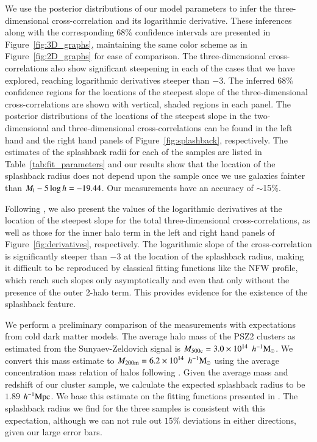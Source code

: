 \documentclass[iop, apjl, twocolappendix, numberedappendix]{emulateapj}
\def\mpch{h^{-1}{\rm Mpc}}
\def\msunh{h^{-1}{\rm M_{\odot}}}
\begin{document}
We use the posterior distributions of our model parameters to infer
the three-dimensional cross-correlation and its logarithmic
derivative. These inferences along with the corresponding 68\%
confidence intervals are presented in Figure~\ref{fig:3D_graphs},
maintaining the same color scheme as in Figure~\ref{fig:2D_graphs}
for ease of comparison. The three-dimensional cross-correlations
also show significant steepening in each of the cases that we have
explored, reaching logarithmic derivatives steeper than $-3$. The
inferred 68\% confidence regions for the locations of the steepest
slope of the three-dimensional cross-correlations are shown with
vertical, shaded regions in each panel. The posterior
distributions of the locations of the steepest slope in the
two-dimensional and three-dimensional cross-correlations can be
found in the left hand and the right hand panels of
Figure~\ref{fig:splashback}, respectively. The estimates of the splashback radii
for each of the samples are listed in Table~\ref{tab:fit_parameters}
and our results show that the location of the splashback radius does
not depend upon the sample once we use galaxies fainter than $M_{\rm
i}-5\log h=-19.44$. Our measurements have an accuracy of $\sim$15\%.

Following \citet{baxter2017halo}, we also present the values of the
logarithmic derivatives at the location of the steepest slope for
the total three-dimensional cross-correlations, as well as those for
the inner halo term in the left and right hand panels of
Figure~\ref{fig:derivatives}, respectively. The logarithmic slope of the 
cross-correlation is significantly steeper than $-3$ at the location 
of the splashback radius, making it difficult to
be reproduced by classical fitting functions like the NFW profile,
which reach such slopes only asymptotically and even that only
without the presence of the outer 2-halo term. This provides
evidence for the existence of the splashback feature.

We perform a preliminary comparison of the measurements with
expectations from cold dark matter models. The average halo mass of
the PSZ2 clusters as estimated from the Sunyaev-Zeldovich signal
is $M_{\rm 500c}=3.0\times10^{14}$ $\msunh$. We convert this mass
estimate to $M_{\rm 200m}=6.2\times10^{14}$ $\msunh$ using the average
concentration mass relation of halos following
\citet{HuKravtsov:2003}. Given the average mass and redshift of our
cluster sample, we calculate the expected splashback radius to be
$1.89$ $\mpch$. We base this estimate on the fitting functions
presented in \citet{more2015splashback}. The splashback radius we
find for the three samples is consistent with this expectation,
although we can not rule out $15\%$ deviations in either directions,
given our large error bars.
\end{document}
